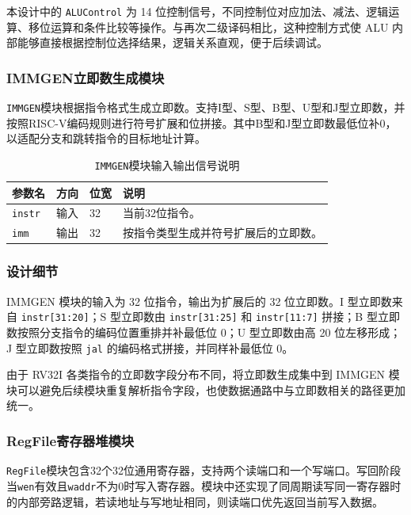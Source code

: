 \documentclass[12pt,a4paper]{ctexart}
\newcommand{\code}[1]{\texttt{#1}}
\begin{document}
本设计中的 \code{ALUControl} 为 14 位控制信号，不同控制位对应加法、减法、逻辑运算、移位运算和条件比较等操作。与再次二级译码相比，这种控制方式使 ALU 内部能够直接根据控制位选择结果，逻辑关系直观，便于后续调试。

\subsubsection{IMMGEN立即数生成模块}

\code{IMMGEN}模块根据指令格式生成立即数。支持I型、S型、B型、U型和J型立即数，并按照RISC-V编码规则进行符号扩展和位拼接。其中B型和J型立即数最低位补0，以适配分支和跳转指令的目标地址计算。

\begin{table}[H]
	\centering
	\caption{\code{IMMGEN}模块输入输出信号说明}
	\footnotesize
	\renewcommand{\arraystretch}{1.15}
	\begin{tabularx}{\textwidth}{p{3.2cm}p{1.5cm}p{2.1cm}X}
		\toprule
		参数名          & 方向 & 位宽 & 说明                 \\
		\midrule
		\code{instr} & 输入 & 32 & 当前32位指令。           \\
		\code{imm}   & 输出 & 32 & 按指令类型生成并符号扩展后的立即数。 \\
		\bottomrule
	\end{tabularx}
\end{table}

\subsubsection*{设计细节}

IMMGEN 模块的输入为 32 位指令，输出为扩展后的 32 位立即数。I 型立即数来自 \code{instr[31:20]}；S 型立即数由 \code{instr[31:25]} 和 \code{instr[11:7]} 拼接；B 型立即数按照分支指令的编码位置重排并补最低位 0；U 型立即数由高 20 位左移形成；J 型立即数按照 \code{jal} 的编码格式拼接，并同样补最低位 0。

由于 RV32I 各类指令的立即数字段分布不同，将立即数生成集中到 IMMGEN 模块可以避免后续模块重复解析指令字段，也使数据通路中与立即数相关的路径更加统一。

\subsubsection{RegFile寄存器堆模块}

\code{RegFile}模块包含32个32位通用寄存器，支持两个读端口和一个写端口。写回阶段当\code{wen}有效且\code{waddr}不为0时写入寄存器。模块中还实现了同周期读写同一寄存器时的内部旁路逻辑，若读地址与写地址相同，则读端口优先返回当前写入数据。
\end{document}

